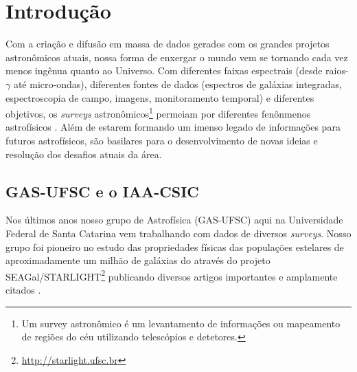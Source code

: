 


\chapter{Introdução}
\label{sec:intro}

Com a criação e difusão em massa de dados gerados com os grandes projetos astronômicos atuais, nossa
forma de enxergar o mundo vem se tornando cada vez menos ingênua quanto ao Universo. Com diferentes
faixas espectrais (desde raios-$\gamma$ até micro-ondas), diferentes fontes de dados (espectros de
galáxias integradas, espectroscopia de campo, imagens, monitoramento temporal) e diferentes
objetivos, os {\em surveys} astronômicos\footnote{Um survey astronômico é um levantamento de
informações ou mapeamento de regiões do céu utilizando telescópios e detetores.} permeiam por
diferentes fenônmenos astrofísicos . Além de estarem
formando um imenso legado de informações para futuros astrofísicos, são basilares para o
desenvolvimento de novas ideias e resolução dos desafios atuais da área.
 
\section{GAS-UFSC e o IAA-CSIC}
\label{sec:intro:UFSCeIAA}

Nos últimos anos nosso grupo de Astrofísica (GAS-UFSC) aqui na Universidade Federal de Santa
Catarina vem trabalhando com dados de diversos {\em surveys}. Nosso grupo foi pioneiro no estudo das
propriedades físicas das populações estelares de aproximadamente um milhão de galáxias do \SDSS
através do projeto
SEAGal/STARLIGHT\footnote{\href{http://starlight.ufsc.br}{http://starlight.ufsc.br}} publicando
diversos artigos importantes e amplamente citados \citep[e.g., ][]{CidFernandes.etal.2005a,
Mateus.etal.2006a, Stasinska.etal.2006a, Asari.etal.2007a, Stasinska.etal.2008a,
CidFernandes.etal.2011a}.

